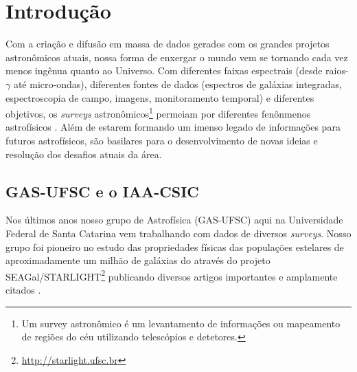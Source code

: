 


\chapter{Introdução}
\label{sec:intro}

Com a criação e difusão em massa de dados gerados com os grandes projetos astronômicos atuais, nossa
forma de enxergar o mundo vem se tornando cada vez menos ingênua quanto ao Universo. Com diferentes
faixas espectrais (desde raios-$\gamma$ até micro-ondas), diferentes fontes de dados (espectros de
galáxias integradas, espectroscopia de campo, imagens, monitoramento temporal) e diferentes
objetivos, os {\em surveys} astronômicos\footnote{Um survey astronômico é um levantamento de
informações ou mapeamento de regiões do céu utilizando telescópios e detetores.} permeiam por
diferentes fenônmenos astrofísicos . Além de estarem
formando um imenso legado de informações para futuros astrofísicos, são basilares para o
desenvolvimento de novas ideias e resolução dos desafios atuais da área.
 
\section{GAS-UFSC e o IAA-CSIC}
\label{sec:intro:UFSCeIAA}

Nos últimos anos nosso grupo de Astrofísica (GAS-UFSC) aqui na Universidade Federal de Santa
Catarina vem trabalhando com dados de diversos {\em surveys}. Nosso grupo foi pioneiro no estudo das
propriedades físicas das populações estelares de aproximadamente um milhão de galáxias do \SDSS
através do projeto
SEAGal/STARLIGHT\footnote{\href{http://starlight.ufsc.br}{http://starlight.ufsc.br}} publicando
diversos artigos importantes e amplamente citados \citep[e.g., ][]{CidFernandes.etal.2005a,
Mateus.etal.2006a, Stasinska.etal.2006a, Asari.etal.2007a, Stasinska.etal.2008a,
CidFernandes.etal.2011a}.

